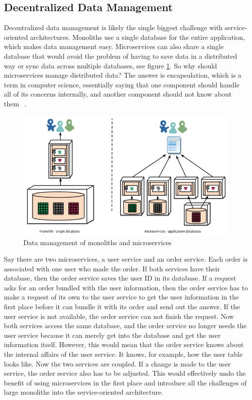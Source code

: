 \subsection{Decentralized Data Management}
\label{sec:theory:decentralized-data}

Decentralized data management is likely the single biggest challenge with service-oriented architectures. Monoliths use a single database for the entire application, which makes data management easy. Microservices can also share a single database that would avoid the problem of having to save data in a distributed way or sync data across multiple databases, see figure \ref{fig:decentralised-data}. So why should microservices manage distributed data? The answer is encapsulation, which is a term in computer science, essentially saying that one component should handle all of its concerns internally, and another component should not know about them ~\cite{krivtsov.2019}.

\begin{figure}[ht!]
  \centering
  \includegraphics[width=0.7\linewidth]{assets/decentralised-data.png}
  \caption{Data management of monoliths and microservices}
  \label{fig:decentralised-data}
\end{figure}

Say there are two microservices, a user service and an order service. Each order is associated with one user who made the order. If both services have their database, then the order service saves the user ID in its database. If a request asks for an order bundled with the user information, then the order service has to make a request of its own to the user service to get the user information in the first place before it can bundle it with its order and send out the answer. If the user service is not available, the order service can not finish the request. Now both services access the same database, and the order service no longer needs the user service because it can merely get into the database and get the user information itself. However, this would mean that the order service knows about the internal affairs of the user service. It knows, for example, how the user table looks like. Now the two services are coupled. If a change is made to the user service, the order service also has to be adjusted. This would effectively undo the benefit of using microservices in the first place and introduce all the challenges of large monoliths into the service-oriented architecture.

